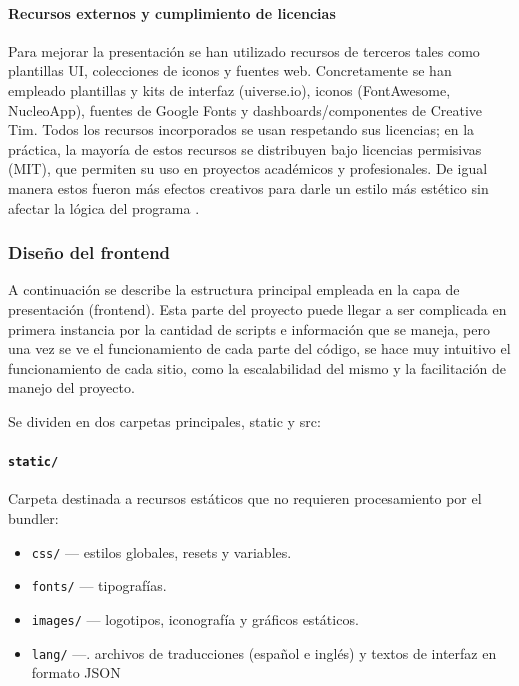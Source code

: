 \documentclass[12pt, a4paper]{article}
\begin{document}
\paragraph{Recursos externos y cumplimiento de licencias}
Para mejorar la presentación se han utilizado recursos de terceros tales como plantillas UI, colecciones de iconos y fuentes web. Concretamente se han empleado plantillas y kits de interfaz (uiverse.io), iconos (FontAwesome, NucleoApp), fuentes de Google Fonts y dashboards/componentes de Creative Tim. Todos los recursos incorporados se usan respetando sus licencias; en la práctica, la mayoría de estos recursos se distribuyen bajo licencias permisivas (MIT), que permiten su uso en proyectos académicos y profesionales. De igual manera estos fueron más efectos creativos para darle un estilo más estético sin afectar la lógica del programa \cite{MITLicense}\cite{FontAwesome}\cite{GoogleFonts}\cite{CreativeTim}\cite{uiverse}.

\subsubsection{Diseño del frontend}

A continuación se describe la estructura principal empleada en la capa de presentación (frontend). Esta parte del proyecto puede llegar a ser complicada en primera instancia por la cantidad de scripts e información que se maneja, pero una vez se ve el funcionamiento de cada parte del código, se hace muy intuitivo el funcionamiento de cada sitio, como la escalabilidad del mismo y la facilitación de manejo del proyecto.

Se dividen en dos carpetas principales, static y src:



\paragraph{\texttt{static/}}  
Carpeta destinada a recursos estáticos que no requieren procesamiento por el bundler:
\begin{itemize}
	\item \texttt{css/} — estilos globales, resets y variables.
	\item \texttt{fonts/} — tipografías.
	\item \texttt{images/} — logotipos, iconografía y gráficos estáticos.
	\item \texttt{lang/} —. archivos de traducciones (español e inglés) y textos de interfaz en formato JSON
\end{itemize}
\end{document}
